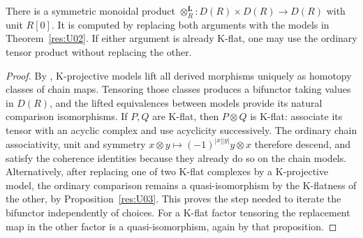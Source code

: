 \begin{theorem}\label{res:U07}
There is a symmetric monoidal product
\(\otimes_R^{\mathbf L}:D(R)\times D(R)\to D(R)\) with unit \(R[0]\).
It is computed by replacing both arguments with the models in
Theorem~\ref{res:U02}. If either argument is already K-flat, one
may use the ordinary tensor product without replacing the other.
\end{theorem}
\begin{proof}
By \cite[R04]{ha-core}, K-projective models lift all derived
morphisms uniquely as homotopy classes of chain maps.
Tensoring those classes produces a bifunctor taking values in
\(D(R)\), and the lifted equivalences between models provide its
natural comparison isomorphisms. If \(P,Q\) are K-flat, then
\(P\otimes Q\) is K-flat: associate its tensor with an acyclic
complex and use acyclicity successively. The ordinary chain
associativity, unit and symmetry
\(x\otimes y\mapsto(-1)^{|x||y|}y\otimes x\)
therefore descend, and satisfy the coherence identities because
they already do so on the chain models. Alternatively, after
replacing one of two K-flat complexes by a K-projective model,
the ordinary comparison remains a quasi-isomorphism by the
K-flatness of the other, by Proposition~\ref{res:U03}.
This proves the step needed to iterate the bifunctor independently
of choices. For a K-flat factor tensoring the replacement map in
the other factor is a quasi-isomorphism, again by that proposition.
\end{proof}


